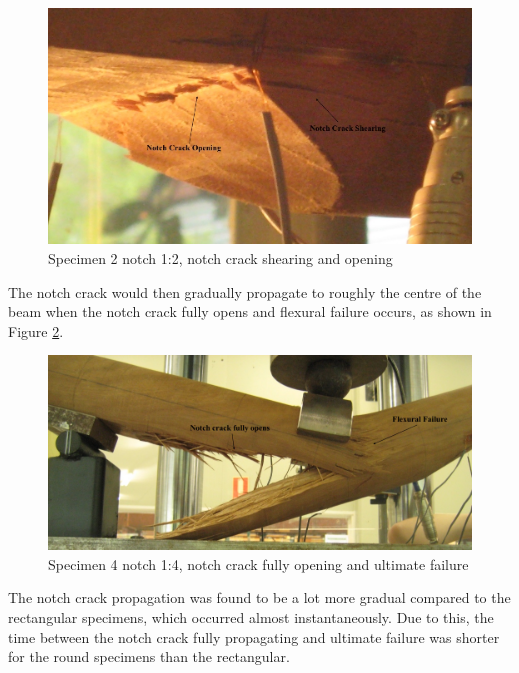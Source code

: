 \documentclass[11pt,a4paper]{article}
\numberwithin{equation}{subsection}
\begin{document}
\begin{figure}[h]
	\begin{center}
	\includegraphics[scale=0.35]{Roun_Crack_Open}
	\end{center}
	\caption{Specimen 2 notch 1:2, notch crack shearing and opening}
	\label{fig:Round_open}
\end{figure}

\pagebreak

\noindent
The notch crack would then gradually propagate to roughly the centre of the beam when the notch crack fully opens and flexural failure occurs, as shown in Figure \ref{fig:Round_Fail}.

\vspace*{\baselineskip}

\begin{figure}[h]
	\begin{center}
		\includegraphics[scale=0.4]{Round_Fail}
	\end{center}
	\caption{Specimen 4 notch 1:4, notch crack fully opening and ultimate failure}
	\label{fig:Round_Fail}
\end{figure}

\noindent
The notch crack propagation was found to be a lot more gradual compared to the rectangular specimens, which occurred almost instantaneously. Due to this, the time between the notch crack fully propagating and ultimate failure was shorter for the round specimens than the rectangular. 
\end{document}
